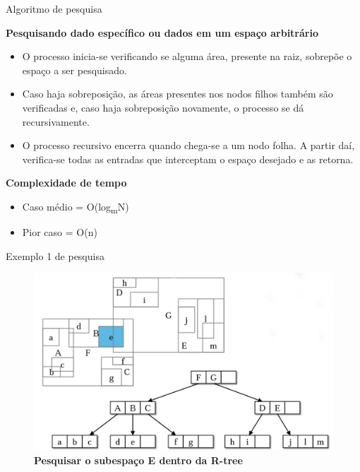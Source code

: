 \documentclass[compress,aspectratio=169]{beamer}
\begin{document}
\begin{frame}{Algoritmo de pesquisa}
    \par \textbf{Pesquisando dado específico ou dados em um espaço arbitrário}
    \begin{itemize}
        \item O processo inicia-se verificando se alguma área, presente na raiz, sobrepõe o espaço a ser pesquisado.
        \item Caso haja sobreposição, as áreas presentes nos nodos filhos também são verificadas e, caso haja sobreposição novamente, o processo se dá recursivamente.
        \item O processo recursivo encerra quando chega-se a um nodo folha. A partir daí, verifica-se todas as entradas que interceptam o espaço desejado e as retorna.
    \end{itemize}
    \par \textbf{Complexidade de tempo}
    \begin{itemize}
        \item Caso médio = O(log\textsubscript{m}N)
        \item Pior caso = O(n)
    \end{itemize}
\end{frame}

\begin{frame}{Exemplo 1 de pesquisa}
\begin{figure}[] 
        \centering
        \includegraphics[width=0.73\linewidth]{pesquisa.png}
        \caption{\textbf{Pesquisar o subespaço E dentro da R-tree}}
        \label{fig:enter-label}  
\end{figure}
\end{frame}
\end{document}
